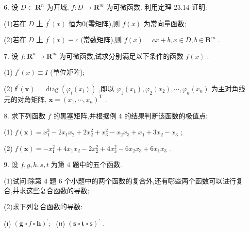 6. 设 \(D \subset  {\mathbf{R}}^{n}\) 为开域, \(f : D \rightarrow  {\mathbf{R}}^{m}\) 为可微函数. 利用定理 23.14 证明:

(1)若在 \(D\) 上 \({f}^{\prime }\left( x\right)\) 恒为0(零矩阵),则 \(f\left( x\right)\) 为常向量函数;

(2)若在 \(D\) 上 \({f}^{\prime }\left( x\right)  \equiv  c\) (常数矩阵),则 \(f\left( x\right)  = {cx} + b,x \in  D,b \in  {\mathbf{R}}^{m}\) .

7. 设 \(f : {\mathbf{R}}^{n} \rightarrow  {\mathbf{R}}^{m}\) 为可微函数,试求分别满足以下条件的函数 \(f\left( x\right)\) :

(1) \({f}^{\prime }\left( x\right)  \equiv  I\) (单位矩阵);

(2) \({\mathbf{f}}^{\prime }\left( \mathbf{x}\right)  = \operatorname{diag}\left( {{\varphi }_{i}\left( {x}_{i}\right) }\right)\) ,即以 \({\varphi }_{1}\left( {x}_{1}\right) ,{\varphi }_{2}\left( {x}_{2}\right) ,\cdots ,{\varphi }_{n}\left( {x}_{n}\right)\) 为主对角线元的对角矩阵, \(\mathbf{x} = {\left( {x}_{1},\cdots ,{x}_{n}\right) }^{\mathrm{T}}\) .

8. 求下列函数 \(f\) 的黑塞矩阵,并根据例 4 的结果判断该函数的极值点:

(1) \(f\left( \mathbf{x}\right)  = {x}_{1}^{2} - 2{x}_{1}{x}_{2} + 2{x}_{2}^{2} + {x}_{3}^{2} - {x}_{2}{x}_{3} + {x}_{1} + 3{x}_{2} - {x}_{3}\) ;

(2) \(f\left( \mathbf{x}\right)  =  - {x}_{1}^{2} + 4{x}_{1}{x}_{2} - 2{x}_{2}^{2} + 4{x}_{3}^{2} - 6{x}_{2}{x}_{3} + 6{x}_{1}{x}_{3}\) .

9. 设 \(f,g,h,s,t\) 为第 4 题中的五个函数.

(1)试问:除第 4 题 6 个小题中的两个函数的复合外,还有哪些两个函数可以进行复合,并求这些复合函数的导数;

(2)求下列复合函数的导数:

(i) \({\left( \mathbf{g} \circ  f \circ  \mathbf{h}\right) }^{\prime };\;\) (ii) \({\left( \mathbf{s} \circ  \mathbf{t} \circ  \mathbf{s}\right) }^{\prime }\) .

